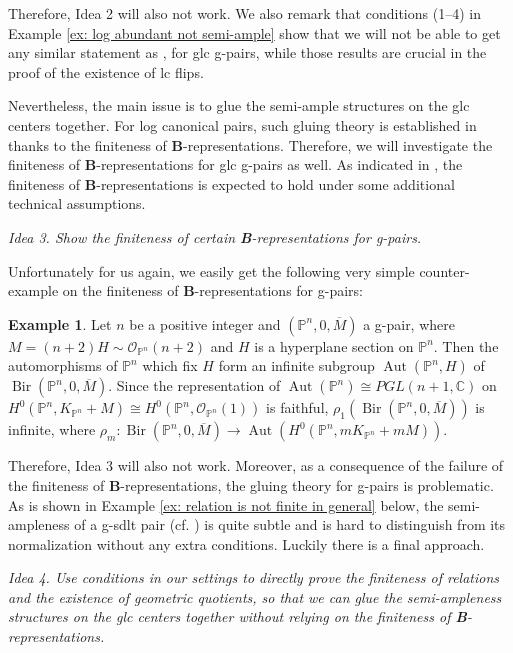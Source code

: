 \documentclass[11pt]{amsart}
\numberwithin{equation}{section}
\newcommand{\Bb}{{\bf{B}}}
\newcommand{\Cc}{\mathbb{C}}
\newcommand{\Pp}{\mathbb{P}}
\newcommand{\Bir}{\operatorname{Bir}}
\newcommand{\Aut}{\operatorname{Aut}}
\newcommand{\Oo}{\mathcal{O}}
\theoremstyle{definition}
\theoremstyle{definition}
\newtheorem{ex}[thm]{Example}
\theoremstyle{definition}
\begin{document}
Therefore, Idea 2 will also not work. We also remark that conditions
(1--4) in Example \ref{ex: log abundant not semi-ample} show that we
will not be able to get any similar statement as \cite[Theorem
1.7]{Bir12}, \cite[Corollary 1.5]{HX16} for glc g-pairs, while those
results are crucial in the proof of the existence of lc flips.

Nevertheless, the main issue is to glue the semi-ample structures on
the glc centers together. For log canonical pairs, such gluing theory
is established in \cite{FG14,HX16} thanks to the finiteness of
\Bb-representations. Therefore, we will investigate the finiteness of
\Bb-representations for glc g-pairs as well. As indicated in
\cite{Hu21}, the finiteness of \Bb-representations is expected to
hold under some additional technical assumptions.

\smallskip

\noindent\textit{Idea 3. Show the finiteness of certain
\Bb-representations for g-pairs.}

\smallskip

Unfortunately for us again, we easily get the following very simple
counter-example on the finiteness of \textbf{B}-representations for g-pairs:

\begin{ex}\label{ex: fail finiteness b representation}
  Let $n$ be a positive integer and $(\Pp^n,0,\overline{M})$ a
  g-pair, where $M=(n+2)H\sim\Oo_{\Pp^n}(n+2)$ and $H$ is a
  hyperplane section on $\mathbb P^n$. Then the automorphisms of
  $\Pp^n$ which fix $H$ form an infinite subgroup $\Aut(\Pp^n,H)$ of
  $\Bir(\Pp^n,0,\overline{M})$. Since the representation of
  $\Aut(\Pp^n)\cong PGL(n+1,\Cc)$ on $H^0(\Pp^n, K_{\Pp^n}+M)\cong
  H^0(\Pp^n,\Oo_{\Pp^n}(1))$ is faithful,
  $\rho_1(\Bir(\Pp^n,0,\overline{M}))$ is infinite, where $\rho_m:
  \Bir(\Pp^n,0,\overline{M})\to \Aut(H^0(\Pp^n,mK_{\Pp^n}+mM))$.
\end{ex}

Therefore, Idea 3 will also not work. Moreover, as a consequence of
the failure of the finiteness of \textbf{B}-representations, the
gluing theory for g-pairs is problematic. As is shown in Example
\ref{ex: relation is not finite in general} below, the semi-ampleness
of a g-sdlt pair (cf. \cite{Hu21}) is quite subtle and is hard to
distinguish from its normalization without any extra conditions.
Luckily there is a final approach.

\smallskip

\noindent\textit{Idea 4. Use conditions in our settings to directly
  prove the finiteness of relations and the existence of geometric
  quotients, so that we can glue the semi-ampleness structures on the
  glc centers together without relying on the finiteness of
{\rm{\textbf{B}}}-representations.}
\end{document}
